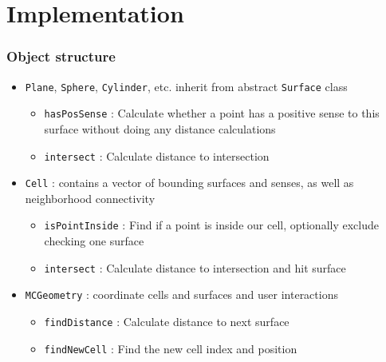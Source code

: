 \documentclass{beamer}
\begin{document}
\section{Implementation}
\begin{frame}
\frametitle{Object structure}
\begin{itemize}
  \item \texttt{Plane}, \texttt{Sphere},
        \texttt{Cylinder}, etc. inherit from abstract \texttt{Surface} class
    \begin{itemize}
      \item \texttt{hasPosSense}
        : Calculate whether a point has a positive sense to this
        surface without doing any distance calculations
      \item \texttt{intersect}
        : Calculate distance to intersection
    \end{itemize}
  \item \texttt{Cell} : contains a vector of bounding surfaces and senses, as
    well as neighborhood connectivity
    \begin{itemize}
      \item \texttt{isPointInside}
        : Find if a point is inside our cell, optionally exclude checking one
        surface
      \item \texttt{intersect}
        : Calculate distance to intersection and hit surface
    \end{itemize}
  \item \texttt{MCGeometry} : coordinate cells and surfaces and user
    interactions
    \begin{itemize}
      \item \texttt{findDistance}
        : Calculate distance to next surface
      \item \texttt{findNewCell}
        : Find the new cell index and position
    \end{itemize}
\end{itemize}
\end{frame}
\end{document}
